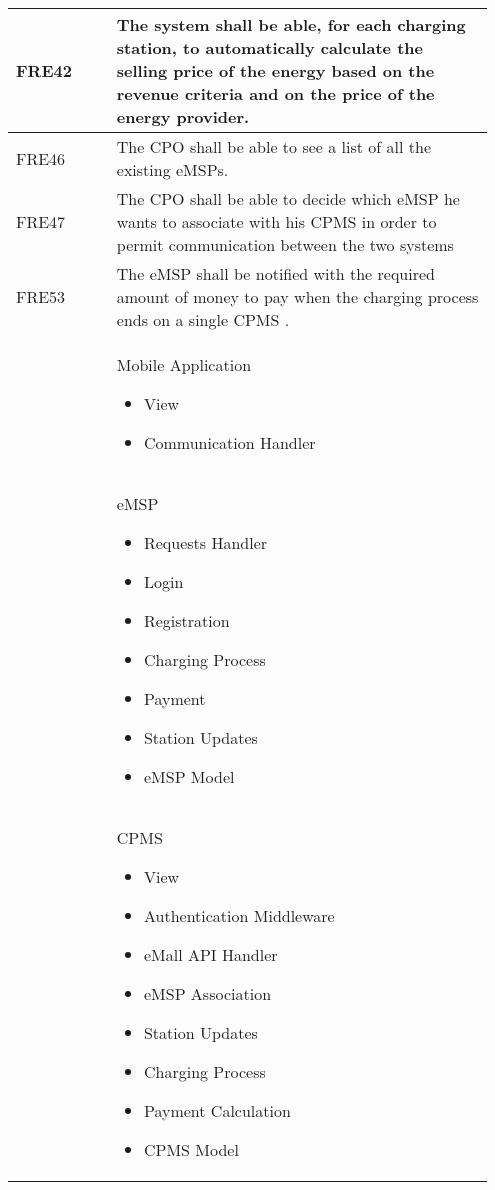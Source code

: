 {\begin{longtable}{|p{0.20\linewidth}p{0.75\linewidth} |}
    \hline
    \rowcolor{bluepoli!15} FRE42 & The system shall be able, for each charging station, to automatically calculate the selling price of the energy based on the revenue criteria and on the price of the energy provider. \\
    \hline
    \rowcolor{bluepoli!15}
    FRE46 & The CPO shall be able to see a list of all the existing eMSPs. \\
    \hline
    \rowcolor{bluepoli!15} FRE47 &  The CPO shall be able to decide which eMSP he wants to associate with his CPMS in order to permit communication between the two systems \\
    \hline
    \rowcolor{bluepoli!15} FRE53 &  The eMSP shall be notified with the required amount of money to pay when the charging process ends on a single CPMS .\\
    \hline
    \rowcolor{bluepoli!5}  & Mobile Application  \newline
    \begin{itemize}
        \item View
        \item Communication Handler
    \end{itemize} \\
    \hline
    \rowcolor{bluepoli!5}  & eMSP  \newline
    \begin{itemize}
        \item Requests Handler
        \item Login
        \item Registration
        \item Charging Process
        \item Payment
        \item Station Updates
        \item eMSP Model
    \end{itemize} \\
    \hline
    \rowcolor{bluepoli!5}  & CPMS  \newline
    \begin{itemize}
        \item View
        \item Authentication Middleware
        \item eMall API Handler
        \item eMSP Association
        \item Station Updates
        \item Charging Process
        \item Payment Calculation
        \item CPMS Model
    \end{itemize} \\
    \hline
\end{longtable}}
